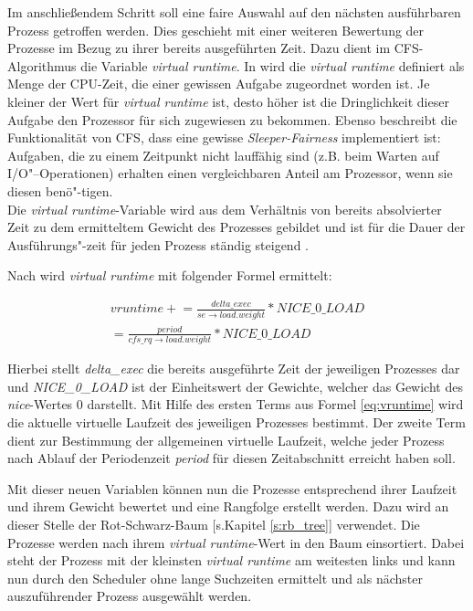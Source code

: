 Im anschließendem Schritt soll eine faire Auswahl auf den nächsten ausführbaren Prozess getroffen werden. Dies geschieht mit einer weiteren Bewertung der Prozesse im Bezug zu ihrer bereits ausgeführten Zeit. 
Dazu dient im CFS-Algorithmus die Variable \textit{virtual runtime}. In \cite{mjones} wird die \textit{virtual runtime} definiert als Menge der CPU-Zeit, die einer gewissen Aufgabe zugeordnet worden ist. Je kleiner der Wert für \textit{virtual runtime} ist, desto höher ist die Dringlichkeit dieser Aufgabe den Prozessor für sich zugewiesen zu bekommen. Ebenso beschreibt \cite{mjones} die Funktionalität von CFS, dass eine gewisse \textit{Sleeper-Fairness} implementiert ist: Aufgaben, die zu einem Zeitpunkt nicht lauffähig sind (z.B. beim Warten auf I/O"--Operationen) erhalten ei\-nen vergleichbaren Anteil am Prozessor, wenn sie diesen benö"-tigen.\\
Die \textit{virtual runtime}-Variable wird aus dem Verhältnis von bereits absolvierter Zeit zu dem ermitteltem Gewicht des Prozesses gebildet und ist für die Dauer der Ausführungs"-zeit für jeden Prozess ständig steigend \cite{rlove}. 

Nach \cite{paperfairness} wird \textit{virtual runtime} mit folgender Formel ermittelt:

\begin{multline}
vruntime \mathrel{+}= \frac{delta\_exec}{se\rightarrow load.weight} * NICE\_0\_LOAD \\ = \frac{period}{cfs\_rq\rightarrow load.weight} * NICE\_0\_LOAD
\label{eq:vruntime}
\end{multline}

Hierbei stellt \textit{delta\_exec} die bereits ausgeführte Zeit der jeweiligen Prozesses dar und \textit{NICE\_0\_LOAD} ist der Einheitswert der Gewichte, welcher das Gewicht des \textit{nice}-Wertes 0 darstellt.  
Mit Hilfe des ersten Terms aus Formel \ref{eq:vruntime} wird die aktuelle virtuelle Laufzeit des jeweiligen Prozesses bestimmt. Der zweite Term dient zur Bestimmung der allgemeinen virtuelle Laufzeit, welche jeder Prozess nach Ablauf der Periodenzeit \textit{period} für diesen Zeitabschnitt erreicht haben soll. 

Mit dieser neuen Variablen können nun die Prozesse entsprechend ihrer Laufzeit und ihrem Gewicht bewertet und eine Rangfolge erstellt werden. Dazu wird an dieser Stelle der Rot-Schwarz-Baum [s.Kapitel \ref{s:rb_tree}] verwendet. Die Prozesse werden nach ihrem \textit{virtual runtime}-Wert in den Baum einsortiert. Dabei steht der Prozess mit der kleinsten \textit{virtual runtime} am weitesten links und kann nun durch den Scheduler ohne lange Suchzeiten ermittelt und als nächster auszuführender Prozess ausgewählt werden. 

